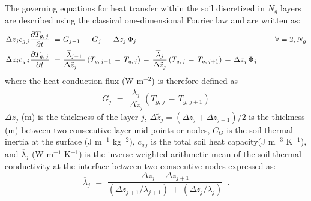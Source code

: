 %
The governing equations for heat transfer within the soil discretized
in $N_g$ layers are described using the classical one-dimensional Fourier
law and are written as:
%
\begin{subequations}
\begin{align}
\label{teq}
\Delta z_j c_{g\,j}\frac{\partial T_{g,\,j}}{\partial t } \,\,=&\,\,
G_{j-1} \,-\, G_j 
\,+\,\Delta z_j\,\Phi_j
\hskip2.5in
\forall = 2,N_g
\\
\label{teq_flux}
\Delta z_j c_{g\,j}\frac{\partial T_{g,\,j}}{\partial t } \,\,=&\,\,
\frac{{\overline\lambda}_{j-1}}{\Delta {\tilde z}_{j-1}}
\left( T_{g,\,j-1} \,-\, T_{g,\,j}\right)
\,-\,
\frac{{\overline\lambda}_j}{\Delta {\tilde z}_j}
\left( T_{g,\,j} \,-\, T_{g,\,j+1}\right)
\,+\,\Delta z_j\,\Phi_j
%
\end{align}
\end{subequations}
%
where the heat conduction flux (W m$^{-2}$) 
is therefore defined as
%
\begin{equation}
\label{teq_flux}
G_j \,\,=\,\,
\frac{{\overline\lambda}_j}{\Delta {\tilde z}_j}
\left( T_{g,\,j} \,-\, T_{g,\,j+1}\right)
%
\end{equation}
%
$\Delta z_j$ (m) is the thickness of the layer $j$,
$\Delta {\tilde z}_j=\left(\Delta z_j+\Delta z_{j+1}\right)/2$ 
is the thickness (m) between two consecutive layer mid-points or nodes,
$C_G$ is the soil thermal inertia at the surface (J m$^{-1}$
kg$^{-2}$),
$c_{g\,j}$ is the total soil heat capacity(J m$^{-3}$ K$^{-1}$), and
${\overline\lambda}_j$ (W m$^{-1}$ K$^{-1}$)
is the inverse-weighted arithmetic mean of the soil thermal conductivity 
at the interface between two consecutive nodes
expressed as:
%
\begin{equation}\label{thckwtdif}
{\overline \lambda}_j \,\,=\,\, 
\frac{\Delta z_{j} + \Delta z_{j+1}}
{\left(\Delta z_{j+1}/\lambda_{j+1}\right) \,+\,
\left(\Delta z_{j}/\lambda_{j}\right)}
\,\,\, .
\end{equation}
%

